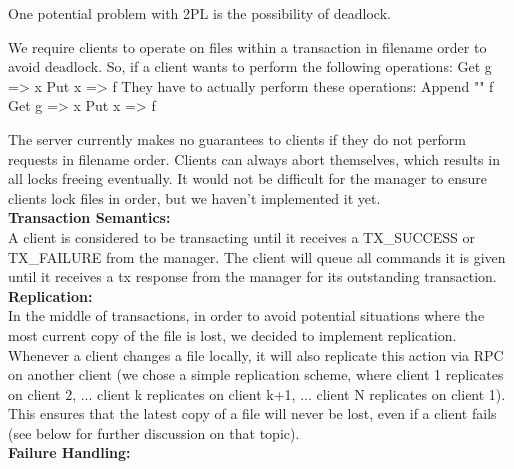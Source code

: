 \documentclass[11pt]{article}
\begin{document}
One potential problem with 2PL is the possibility of deadlock.

We require clients to operate on files within a transaction in filename order to avoid deadlock.
So, if a client wants to perform the following operations: 
	Get g => x
	Put x => f
They have to actually perform these operations:
	Append "" f
	Get g => x
	Put x => f

The server currently makes no guarantees to clients if they do not perform requests in filename order.
Clients can always abort themselves, which results in all locks freeing eventually.
It would not be difficult for the manager to ensure clients lock files in order, but we haven't implemented it yet. \\

\textbf{Transaction Semantics:} \\

A client is considered to be transacting until it receives a TX_SUCCESS or TX_FAILURE from the manager.
The client will queue all commands it is given until it receives a tx response from the manager for its outstanding transaction. \\

\textbf{Replication:} \\

In the middle of transactions, in order to avoid potential situations where the most current copy of the file is lost, we decided to implement replication. Whenever a client changes a file locally,
it will also replicate this action via RPC on another client (we chose a simple replication scheme, where client 1 replicates on client 2, ... client k replicates on client k+1, ... client N replicates on client 1).
This ensures that the latest copy of a file will never be lost, even if a client fails (see below for further discussion on that topic). \\

\textbf{Failure Handling:} \\
\end{document}
